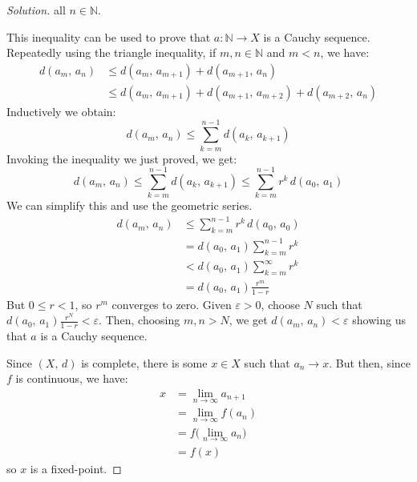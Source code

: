 \documentclass{article}
\theoremstyle{normal}
\begin{document}
\begin{proof}[Solution]
        all $n\in\mathbb{N}$.
        \par\hfill\par
        This inequality can be used to prove that $a:\mathbb{N}\rightarrow{X}$
        is a Cauchy sequence. Repeatedly using the triangle inequality,
        if $m,n\in\mathbb{N}$ and $m<n$, we have:
        \begin{align}
            d(a_{m},\,a_{n})
            &\leq{d}(a_{m},\,a_{m+1})+d(a_{m+1},\,a_{n})\\
            &\leq{d}(a_{m},\,a_{m+1})+d(a_{m+1},\,a_{m+2})+d(a_{m+2},\,a_{n})
        \end{align}
        Inductively we obtain:
        \begin{equation}
            d(a_{m},\,a_{n})
            \leq\sum_{k=m}^{n-1}d(a_{k},\,a_{k+1})
        \end{equation}
        Invoking the inequality we just proved, we get:
        \begin{equation}
            d(a_{m},\,a_{n})
            \leq\sum_{k=m}^{n-1}d(a_{k},\,a_{k+1})
            \leq\sum_{k=m}^{n-1}r^{k}\,d(a_{0},\,a_{1})
        \end{equation}
        We can simplify this and use the geometric series.
        \begin{align}
            d(a_{m},\,a_{n})
            &\leq\sum_{k=m}^{n-1}r^{k}\,d(a_{0},\,a_{0})\\
            &=d(a_{0},\,a_{1})\sum_{k=m}^{n-1}r^{k}\\
            &<d(a_{0},\,a_{1})\sum_{k=m}^{\infty}r^{k}\\
            &=d(a_{0},\,a_{1})\frac{r^{m}}{1-r}
        \end{align}
        But $0\leq{r}<1$, so $r^{m}$ converges to zero. Given
        $\varepsilon>0$, choose $N$ such that
        $d(a_{0},\,a_{1})\frac{r^{N}}{1-r}<\varepsilon$. Then, choosing
        $m,n>N$, we get $d(a_{m},\,a_{n})<\varepsilon$ showing us that
        $a$ is a Cauchy sequence.
        \par\hfill\par
        Since $(X,\,d)$ is complete, there is some $x\in{X}$ such that
        $a_{n}\rightarrow{x}$. But then, since $f$ is continuous, we have:
        \begin{align}
            x&=\lim_{n\rightarrow\infty}a_{n+1}\\
            &=\lim_{n\rightarrow\infty}f(a_{n})\\
            &=f\big(\lim_{n\rightarrow\infty}a_{n}\big)\\
            &=f(x)
        \end{align}
        so $x$ is a fixed-point.
    \end{proof}
\end{document}
